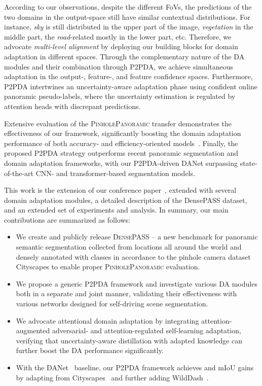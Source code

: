 \documentclass[journal]{IEEEtran}
\begin{document}
According to our observations, despite the different FoVs, the predictions of the two domains in the output-space still have similar contextual distributions. For instance, \emph{sky} is still distributed in the upper part of the image, \emph{vegetation} in the middle part, the \emph{road}-related mostly in the lower part, etc. Therefore, we advocate \emph{multi-level alignment} by deploying our building blocks for domain adaptation in different spaces. 
Through the  complementary nature of the DA modules and their combination through P2PDA, we achieve simultaneous adaptation in the output-, feature-, and feature confidence spaces.
Furthermore, P2PDA intertwines an uncertainty-aware adaptation phase using confident online panoramic pseudo-labels, where the uncertainty estimation is regulated by attention heads with discrepant predictions.

Extensive evaluation of the \textsc{PinholePanoramic} transfer demonstrates the effectiveness of our framework, significantly boosting the domain adaptation performance of both accuracy- and efficiency-oriented models~\cite{danet,fanet,erfnet}.
Finally, the proposed P2PDA strategy outperforms recent panoramic segmentation and domain adaptation frameworks, with our P2PDA-driven DANet surpassing  state-of-the-art CNN- and transformer-based  segmentation models.

This work is the extension of our conference paper~\cite{densepass_itsc}, extended with several domain adaptation modules, a detailed description of the DensePASS dataset, and an extended set of experiments and analysis. In summary, our main contributions are summarized as follows:
\begin{itemize}
\item We create and publicly release \textsc{DensePASS} -- a new benchmark for panoramic semantic segmentation collected from locations all around the world and densely annotated with  classes in accordance to the pinhole camera dataset Cityscapes to enable proper \textsc{PinholePanoramic} evaluation.
\item We propose a generic P2PDA framework and investigate various DA modules both in a separate and joint manner, validating their effectiveness with various networks designed for self-driving scene segmentation.
\item We advocate attentional domain adaptation by integrating attention-augmented adversarial- and attention-regulated self-learning adaptation, verifying that uncertainty-aware distillation with adapted knowledge can further boost the DA performance significantly. 
\item With the DANet~\cite{danet} baseline, our P2PDA framework achieves  and  mIoU gains by adapting from Cityscapes~\cite{cityscapes} and further adding WildDash~\cite{wilddash}.
\end{itemize}
\end{document}
